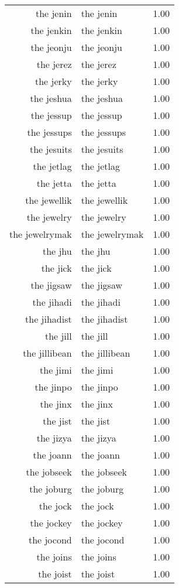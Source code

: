 \begin{table}[ht]
\begin{tabular}{rlr}
  the jenin & the jenin & 1.00 \\ 
  the jenkin & the jenkin & 1.00 \\ 
  the jeonju & the jeonju & 1.00 \\ 
  the jerez & the jerez & 1.00 \\ 
  the jerky & the jerky & 1.00 \\ 
  the jeshua & the jeshua & 1.00 \\ 
  the jessup & the jessup & 1.00 \\ 
  the jessups & the jessups & 1.00 \\ 
  the jesuits & the jesuits & 1.00 \\ 
  the jetlag & the jetlag & 1.00 \\ 
  the jetta & the jetta & 1.00 \\ 
  the jewellik & the jewellik & 1.00 \\ 
  the jewelry & the jewelry & 1.00 \\ 
  the jewelrymak & the jewelrymak & 1.00 \\ 
  the jhu & the jhu & 1.00 \\ 
  the jick & the jick & 1.00 \\ 
  the jigsaw & the jigsaw & 1.00 \\ 
  the jihadi & the jihadi & 1.00 \\ 
  the jihadist & the jihadist & 1.00 \\ 
  the jill & the jill & 1.00 \\ 
  the jillibean & the jillibean & 1.00 \\ 
  the jimi & the jimi & 1.00 \\ 
  the jinpo & the jinpo & 1.00 \\ 
  the jinx & the jinx & 1.00 \\ 
  the jist & the jist & 1.00 \\ 
  the jizya & the jizya & 1.00 \\ 
  the joann & the joann & 1.00 \\ 
  the jobseek & the jobseek & 1.00 \\ 
  the joburg & the joburg & 1.00 \\ 
  the jock & the jock & 1.00 \\ 
  the jockey & the jockey & 1.00 \\ 
  the jocond & the jocond & 1.00 \\ 
  the joins & the joins & 1.00 \\ 
  the joist & the joist & 1.00 \\ 

\end{tabular}
\end{table}
